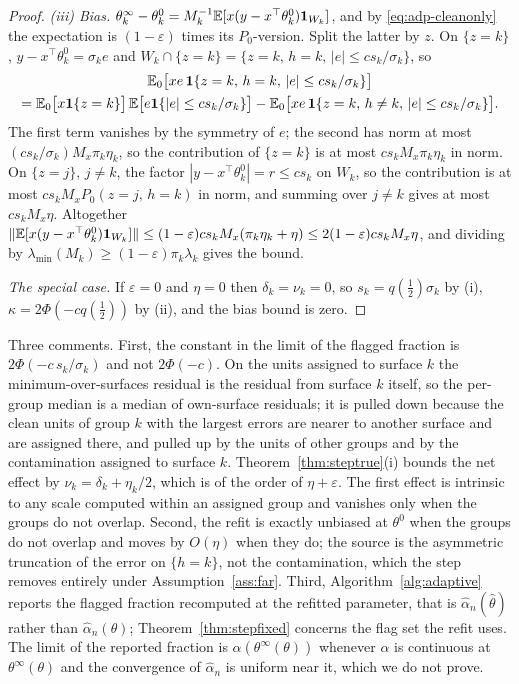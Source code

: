 \begin{proof}
\emph{(iii) Bias.} $\theta^{\infty}_k-\theta^{0}_k=M_k^{-1}\mathbb{E}[x(y-x^{\top}\theta^{0}_k)\mathbf{1}_{W_k}]$,
and by \eqref{eq:adp-cleanonly} the expectation is $(1-\varepsilon)$ times its $P_0$-version.
Split the latter by $z$. On $\{z=k\}$, $y-x^{\top}\theta^{0}_k=\sigma_ke$ and
$W_k\cap\{z=k\}=\{z=k,\,h=k,\,|e|\le cs_k/\sigma_k\}$, so
\begin{multline*}
\mathbb{E}_0\bigl[xe\,\mathbf{1}\{z=k,\,h=k,\,|e|\le cs_k/\sigma_k\}\bigr]\\
=\mathbb{E}_0\bigl[x\mathbf{1}\{z=k\}\bigr]\,\mathbb{E}\bigl[e\mathbf{1}\{|e|\le cs_k/\sigma_k\}\bigr]
-\mathbb{E}_0\bigl[xe\,\mathbf{1}\{z=k,\,h\ne k,\,|e|\le cs_k/\sigma_k\}\bigr].
\end{multline*}
The first term vanishes by the symmetry of $e$; the second has norm at most
$(cs_k/\sigma_k)M_x\pi_k\eta_k$, so the contribution of $\{z=k\}$ is at most
$cs_kM_x\pi_k\eta_k$ in norm. On $\{z=j\}$, $j\ne k$, the factor $|y-x^{\top}\theta^{0}_k|=r\le cs_k$
on $W_k$, so the contribution is at most $cs_kM_xP_0(z=j,\,h=k)$ in norm, and summing over
$j\ne k$ gives at most $cs_kM_x\eta$. Altogether
$\|\mathbb{E}[x(y-x^{\top}\theta^{0}_k)\mathbf{1}_{W_k}]\|\le(1-\varepsilon)cs_kM_x(\pi_k\eta_k+\eta)\le2(1-\varepsilon)cs_kM_x\eta$,
and dividing by $\lambda_{\min}(M_k)\ge(1-\varepsilon)\pi_k\lambda_k$ gives the bound.

\emph{The special case.} If $\varepsilon=0$ and $\eta=0$ then $\delta_k=\nu_k=0$, so
$s_k=q(\tfrac12)\sigma_k$ by (i), $\kappa=2\Phi(-cq(\tfrac12))$ by (ii), and the bias bound
is zero.
\end{proof}

Three comments. First, the constant in the limit of the flagged fraction is
$2\Phi(-c\,s_k/\sigma_k)$ and not $2\Phi(-c)$. On the units assigned to surface $k$ the
minimum-over-surfaces residual is the residual from surface $k$ itself, so the per-group
median is a median of own-surface residuals; it is pulled down because the clean units of
group $k$ with the largest errors are nearer to another surface and are assigned there, and
pulled up by the units of other groups and by the contamination assigned to surface $k$.
Theorem~\ref{thm:steptrue}(i) bounds the net effect by $\nu_k=\delta_k+\eta_k/2$, which is
of the order of $\eta+\varepsilon$. The first effect is intrinsic to any scale computed
within an assigned group and vanishes only when the groups do not overlap. Second, the refit
is exactly unbiased at $\theta^{0}$ when the groups do not overlap and moves by $O(\eta)$
when they do; the source is the asymmetric truncation of the error on $\{h=k\}$, not the
contamination, which the step removes entirely under Assumption~\ref{ass:far}. Third,
Algorithm~\ref{alg:adaptive} reports the flagged fraction recomputed at the refitted
parameter, that is $\hat\alpha_n(\hat\theta)$ rather than $\hat\alpha_n(\theta)$;
Theorem~\ref{thm:stepfixed} concerns the flag set the refit uses. The limit of the reported
fraction is $\alpha(\theta^{\infty}(\theta))$ whenever $\alpha$ is continuous at
$\theta^{\infty}(\theta)$ and the convergence of $\hat\alpha_n$ is uniform near it, which we
do not prove.
